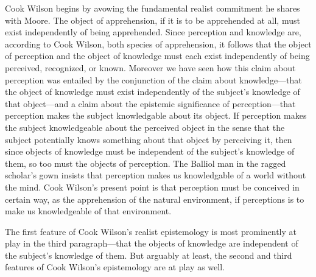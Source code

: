 \documentclass[12pt]{article}
\begin{document}
Cook Wilson begins by avowing the fundamental realist commitment he shares with Moore. The object of apprehension, if it is to be apprehended at all, must exist independently of being apprehended. Since perception and knowledge are, according to Cook Wilson, both species of apprehension, it follows that the object of perception and the object of knowledge must each exist independently of being perceived, recognized, or known. Moreover we have seen how this claim about perception was entailed by the conjunction of the claim about knowledge---that the object of knowledge must exist independently of the subject's knowledge of that object---and a claim about the epistemic significance of perception---that perception makes the subject knowledgable about its object. If perception makes the subject knowledgeable about the perceived object in the sense that the subject potentially knows something about that object by perceiving it, then since objects of knowledge must be independent of the subject's knowledge of them, so too must the objects of perception. The Balliol man in the ragged scholar's gown insists that perception makes us knowledgable of a world without the mind. Cook Wilson's present point is that perception must be conceived in certain way, as the apprehension of the natural environment, if perceptions is to make us knowledgeable of that environment.

The first feature of Cook Wilson's realist epistemology is most prominently at play in the third paragraph---that the objects of knowledge are independent of the subject's knowledge of them. But arguably at least, the second and third features of Cook Wilson's epistemology are at play as well. 
\end{document}
